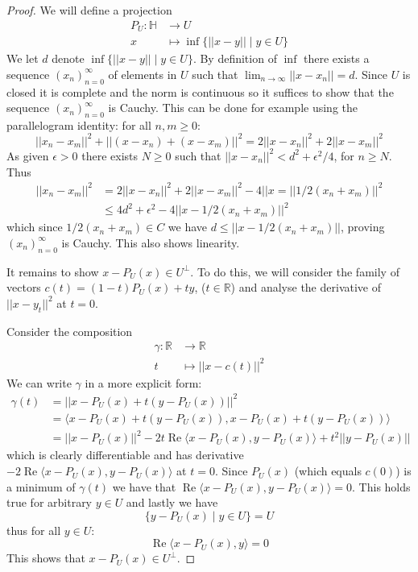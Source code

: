 \documentclass[12pt]{article}
\theoremstyle{plain}
\theoremstyle{definition}
\newcommand{\bb}[1]{\mathbb{#1}}
\newcommand{\lto}{\longrightarrow}
\begin{document}
\begin{proof}
	We will define a projection
	\begin{align*}
		P_U: \bb{H} &\lto U\\
		x &\longmapsto \operatorname{inf}\lbrace ||x - y|| \mid y \in U\rbrace
	\end{align*}
	We let $d$ denote $\operatorname{inf}\lbrace ||x - y|| \mid y \in U\rbrace$. By definition of $\operatorname{inf}$ there exists a sequence $(x_n)_{n=0}^\infty$ of elements in $U$ such that $\lim_{n\to \infty}||x - x_n|| = d$. Since $U$ is closed it is complete and the norm is continuous so it suffices to show that the sequence $(x_n)_{n=0}^\infty$ is Cauchy. This can be done for example using the parallelogram identity: for all $n,m\geq 0$:
	\begin{equation}
		||x_n - x_m||^2 + ||(x - x_n) + (x - x_m)||^2 = 2||x - x_n||^2 + 2||x - x_m||^2
	\end{equation}
	As given $\epsilon > 0$ there exists $N \geq 0$ such that $||x - x_n||^2 < d^2 + \epsilon^2/4$, for $n \geq N$. Thus
	\begin{align*}
		||x_n - x_m||^2 &= 2||x - x_n||^2 + 2||x - x_m||^2 - 4||x = ||1/2(x_n + x_m)||^2\\
		&\leq 4d^2 + \epsilon^2 - 4||x - 1/2(x_n + x_m)||^2
	\end{align*}
	which since $1/2(x_n + x_m) \in C$ we have $d \leq ||x - 1/2(x_n + x_m)||$, proving $(x_n)_{n = 0}^\infty$ is Cauchy. This also shows linearity.
	
	It remains to show $x - P_U(x) \in U^\perp$. To do this, we will consider the family of vectors $c(t) = (1-t)P_U(x) + ty$, ($t \in \bb{R}$) and analyse the derivative of $||x - y_t||^2$ at $t = 0$.
	
	Consider the composition
	\begin{align}
		\gamma: \bb{R} &\lto \bb{R}\\
		t &\longmapsto ||x - c(t)||^2
	\end{align}
	We can write $\gamma$ in a more explicit form:
	\begin{align*}
		\gamma(t) &= ||x - P_U(x) + t(y - P_U(x))||^2\\
		&= \big\langle x - P_U(x) + t(y - P_U(x)),x - P_U(x) + t(y - P_U(x))\big\rangle\\
		&= ||x - P_U(x)||^2 - 2t\operatorname{Re}\langle  x - P_U(x),y - P_U(x)\rangle + t^2||y - P_U(x)||
	\end{align*}
	which is clearly differentiable and has derivative $- 2\operatorname{Re}\langle  x - P_U(x),y - P_U(x)\rangle$ at $t = 0$. Since $P_U(x)$ (which equals $c(0)$) is a minimum of $\gamma(t)$ we have that $\operatorname{Re}\langle  x - P_U(x),y - P_U(x)\rangle = 0$. This holds true for arbitrary $y \in U$ and lastly we have
	\[\lbrace y - P_U(x) \mid y \in U \rbrace = U\]
	thus for all $y \in U$:
	\begin{equation}
		\operatorname{Re}\langle  x - P_U(x),y\rangle = 0
	\end{equation}
	This shows that $x - P_U(x) \in U^\perp$.
\end{proof}
\end{document}
